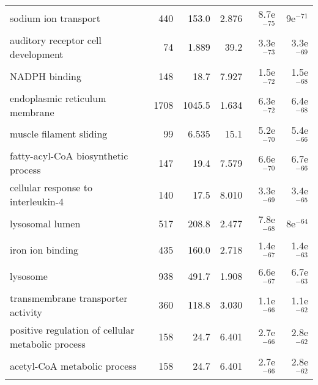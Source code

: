 \begin{longtable}{lrrrrr}
                              sodium ion transport &                     440 &                   153.0 &      2.876 &         8.7e$^{-75}$ &           9e$^{-71}$ \\
                auditory receptor cell development &                      74 &                   1.889 &       39.2 &         3.3e$^{-73}$ &         3.3e$^{-69}$ \\
                                     NADPH binding &                     148 &                    18.7 &      7.927 &         1.5e$^{-72}$ &         1.5e$^{-68}$ \\
                    endoplasmic reticulum membrane &                    1708 &                  1045.5 &      1.634 &         6.3e$^{-72}$ &         6.4e$^{-68}$ \\
                           muscle filament sliding &                      99 &                   6.535 &       15.1 &         5.2e$^{-70}$ &         5.4e$^{-66}$ \\
               fatty-acyl-CoA biosynthetic process &                     147 &                    19.4 &      7.579 &         6.6e$^{-70}$ &         6.7e$^{-66}$ \\
                cellular response to interleukin-4 &                     140 &                    17.5 &      8.010 &         3.3e$^{-69}$ &         3.4e$^{-65}$ \\
                                   lysosomal lumen &                     517 &                   208.8 &      2.477 &         7.8e$^{-68}$ &           8e$^{-64}$ \\
                                  iron ion binding &                     435 &                   160.0 &      2.718 &         1.4e$^{-67}$ &         1.4e$^{-63}$ \\
                                          lysosome &                     938 &                   491.7 &      1.908 &         6.6e$^{-67}$ &         6.7e$^{-63}$ \\
                transmembrane transporter activity &                     360 &                   118.8 &      3.030 &         1.1e$^{-66}$ &         1.1e$^{-62}$ \\
 positive regulation of cellular metabolic process &                     158 &                    24.7 &      6.401 &         2.7e$^{-66}$ &         2.8e$^{-62}$ \\
                      acetyl-CoA metabolic process &                     158 &                    24.7 &      6.401 &         2.7e$^{-66}$ &         2.8e$^{-62}$ \\

\end{longtable}
